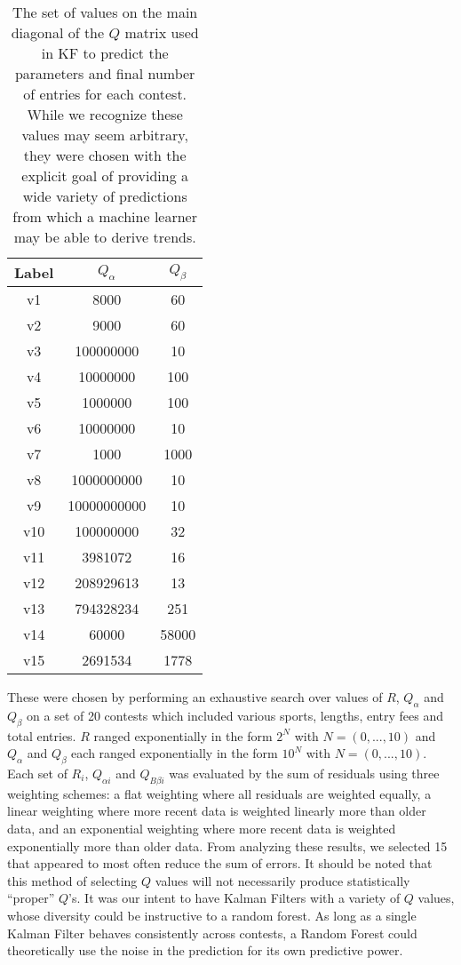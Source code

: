\begin{table}
\begin{center}
\begin{tabular}{| c | c | c |}
\hline
 \textbf{Label} & \textbf{$Q_{\alpha}$} & \textbf{$Q_{\beta}$} \\ 
 \hline
 v1 & 8000 & 60 \\  
 \hline
 v2 & 9000 & 60 \\
 \hline
 v3 & 100000000 & 10 \\
 \hline
 v4 & 10000000 & 100 \\
 \hline
 v5 & 1000000 & 100 \\
 \hline
 v6 & 10000000 & 10 \\
 \hline
 v7 & 1000 & 1000 \\
 \hline
 v8 & 1000000000 & 10 \\
 \hline
 v9 & 10000000000 & 10 \\
 \hline
 v10 & 100000000 & 32 \\
 \hline
 v11 & 3981072 & 16 \\
 \hline
 v12 & 208929613 & 13 \\
 \hline
 v13 & 794328234 & 251 \\
 \hline
 v14 & 60000 & 58000 \\
 \hline
 v15 & 2691534 & 1778 \\
 \hline
\end{tabular}
\caption[Kalman Filter Parameters Utilized]{The set of values on the main diagonal of the $Q$ matrix used in KF to predict the parameters and final number of entries for each contest. While we recognize these values may seem arbitrary, they were chosen with the explicit goal of providing a wide variety of predictions from which a machine learner may be able to derive trends.}
\end{center}
\end{table}

These were chosen by performing an exhaustive search over values of $R$, $Q_{\alpha}$ and $Q_{\beta}$ on a set of 20 contests which included various sports, lengths, entry fees and total entries. $R$ ranged exponentially in the form $2^{N}$ with $N=(0,...,10)$ and $Q_{\alpha}$ and $Q_{\beta}$ each ranged exponentially in the form $10^{N}$ with $N=(0,...,10)$. Each set of $R_{i}$, $Q_{\alpha i}$ and $Q_{B\beta i}$ was evaluated by the sum of residuals using three weighting schemes: a flat weighting where all residuals are weighted equally, a linear weighting where more recent data is weighted linearly more than older data, and an exponential weighting where more recent data is weighted exponentially more than older data. From analyzing these results, we selected 15 that appeared to most often reduce the sum of errors. It should be noted that this method of selecting $Q$ values will not necessarily produce statistically ``proper'' $Q$'s. It was our intent to have Kalman Filters with a variety of $Q$ values, whose diversity could be instructive to a random forest. As long as a single Kalman Filter behaves consistently across contests, a Random Forest could theoretically use the noise in the prediction for its own predictive power.

